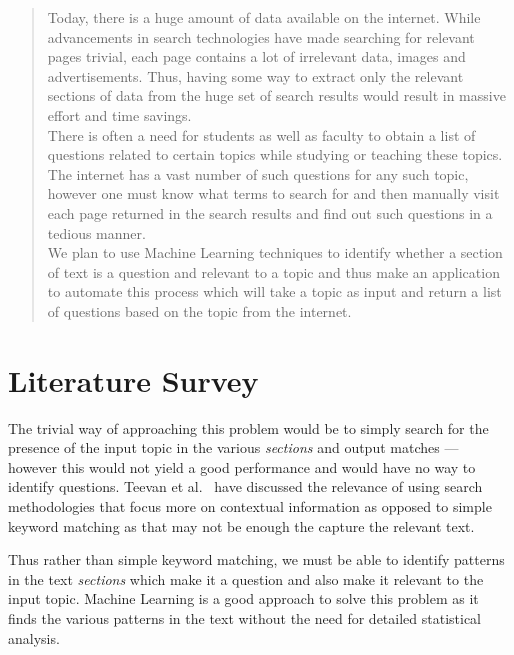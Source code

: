 \documentclass[a4paper,10pt]{report}
\begin{document}
\begin{abstract}

Today, there is a huge amount of data available on the internet. While advancements in search technologies have made searching for relevant pages trivial, each page contains a lot of irrelevant data, images and advertisements. Thus, having some way to extract only the relevant sections of data from the huge set of search results would result in massive effort and time savings. \\

There is often a need for students as well as faculty to obtain a list of questions related to certain topics while studying or teaching these topics. The internet has a vast number of such questions for any such topic, however one must know what terms to search for and then manually visit each page returned in the search results and find out such questions in a tedious manner. \\

We plan to use Machine Learning techniques to identify whether a section of text is a question and relevant to a topic and thus make an application to automate this process which will take a topic as input and return a list of questions based on the topic from the internet.
\end{abstract}


\chapter{Literature Survey}

The trivial way of approaching this problem would be to simply search for the presence of the input topic in the various \emph{sections} and output matches --- however this would not yield a good performance and would have no way to identify questions. Teevan et al.~\cite{teevan} have discussed the relevance of using search methodologies that focus more on contextual information as opposed to simple keyword matching as that may not be enough the capture the relevant text. 

Thus rather than simple keyword matching, we must be able to identify patterns in the text \emph{sections} which make it a question and also make it relevant to the input topic. Machine Learning is a good approach to solve this problem as it finds the various patterns in the text without the need for detailed statistical analysis. \\
\end{document}
